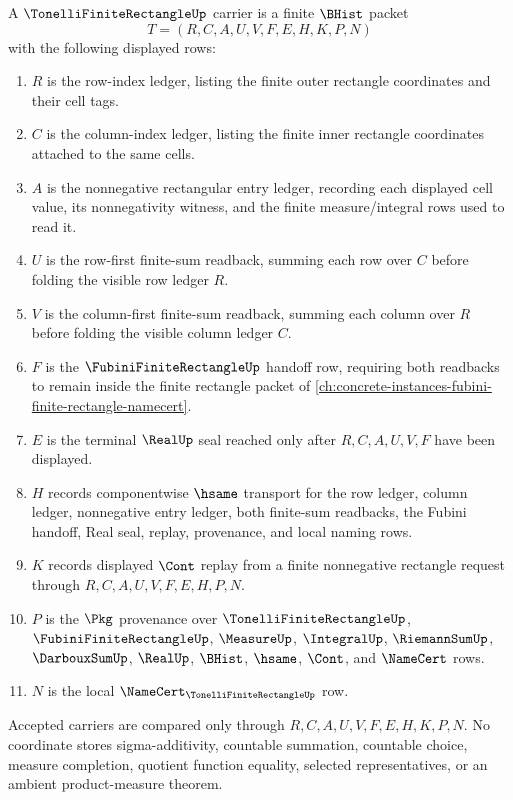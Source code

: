 \begin{definition}
\label{def:tonelli-finite-rectangle-carrier}
A $\TonelliFiniteRectangleUp$ carrier is a finite $\BHist$ packet
$$
T=(R,C,A,U,V,F,E,H,K,P,N)
$$
with the following displayed rows:
\begin{enumerate}
\item $R$ is the row-index ledger, listing the finite outer rectangle coordinates and their cell tags.
\item $C$ is the column-index ledger, listing the finite inner rectangle coordinates attached to the same cells.
\item $A$ is the nonnegative rectangular entry ledger, recording each displayed cell value, its nonnegativity witness, and the finite measure/integral rows used to read it.
\item $U$ is the row-first finite-sum readback, summing each row over $C$ before folding the visible row ledger $R$.
\item $V$ is the column-first finite-sum readback, summing each column over $R$ before folding the visible column ledger $C$.
\item $F$ is the $\FubiniFiniteRectangleUp$ handoff row, requiring both readbacks to remain inside the finite rectangle packet of \autoref{ch:concrete-instances-fubini-finite-rectangle-namecert}.
\item $E$ is the terminal $\RealUp$ seal reached only after $R,C,A,U,V,F$ have been displayed.
\item $H$ records componentwise $\hsame$ transport for the row ledger, column ledger, nonnegative entry ledger, both finite-sum readbacks, the Fubini handoff, Real seal, replay, provenance, and local naming rows.
\item $K$ records displayed $\Cont$ replay from a finite nonnegative rectangle request through $R,C,A,U,V,F,E,H,P,N$.
\item $P$ is the $\Pkg$ provenance over $\TonelliFiniteRectangleUp$, $\FubiniFiniteRectangleUp$, $\MeasureUp$, $\IntegralUp$, $\RiemannSumUp$, $\DarbouxSumUp$, $\RealUp$, $\BHist$, $\hsame$, $\Cont$, and $\NameCert$ rows.
\item $N$ is the local $\NameCert_{\TonelliFiniteRectangleUp}$ row.
\end{enumerate}
Accepted carriers are compared only through $R,C,A,U,V,F,E,H,K,P,N$. No coordinate stores sigma-additivity, countable summation, countable choice, measure completion, quotient function equality, selected representatives, or an ambient product-measure theorem.
\end{definition}

